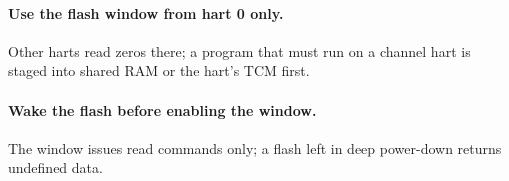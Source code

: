 \paragraph{Use the flash window from hart 0 only.} Other harts read zeros there; a program that must run on a channel hart is staged into shared RAM or the hart's TCM first.

\paragraph{Wake the flash before enabling the window.} The window issues read commands only; a flash left in deep power-down returns undefined data.

